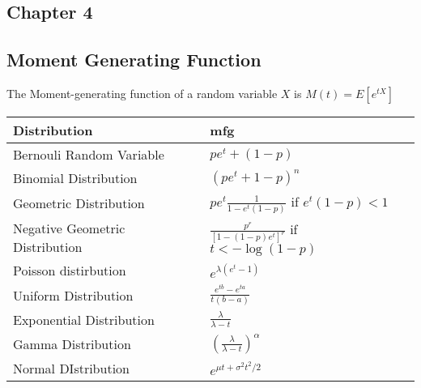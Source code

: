 \documentclass{article}
\begin{document}
\begin{multicols*}{3}
    \section{Chapter 4}
    \subsection{Moment Generating Function}
    The Moment-generating function of a random variable $X$ is $M\left( t \right) = E \left[ e^{tX} \right]$

    \begin{tabularx}{0.9\columnwidth} {
            | >{\raggedright\arraybackslash}X
            | >{\raggedleft\arraybackslash}X |}
        \hline
        Distribution                    & mfg                                                                                \\
        \hline
        Bernouli Random Variable        & $pe^t + \left(1-p\right)$                                                          \\
        \hline
        Binomial Distribution           & $\left(pe^t + 1 - p\right)^n$                                                      \\
        \hline
        Geometric Distribution          & $pe^t \frac{1}{1-e^t\left(1-p\right)}$ if $e^t\left(1-p\right) < 1$                \\
        \hline
        Negative Geometric Distribution & $\frac{p^r}{\left[ 1-\left(1-p\right)e^t \right]^r}$ if $t<-\log \left(1-p\right)$ \\
        \hline
        Poisson distirbution            & $e^{\lambda \left(e^t - 1\right)}$                                                 \\
        \hline
        Uniform Distribution            & $\frac{e^{tb}-e^{ta}}{t\left( b - a\right)}$                                       \\
        \hline
        Exponential Distribution        & $\frac{\lambda}{\lambda-t}$                                                        \\
        \hline
        Gamma Distribution              & $\left(\frac{\lambda}{\lambda-t}\right)^\alpha$                                    \\
        \hline
        Normal DIstribution             & $e^{\mu t + \sigma^2 t^2 / 2}$                                                     \\
        \hline
    \end{tabularx}


\end{multicols*}
\end{document}
